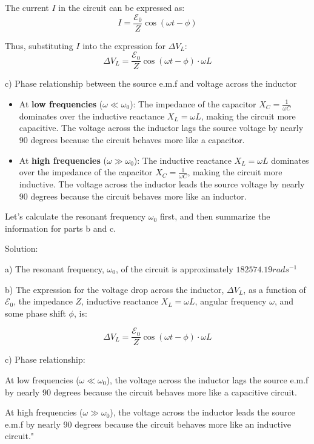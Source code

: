 The current \( I \) in the circuit can be expressed as:
\[ I = \frac{\mathcal{E}_{0}}{Z} \cos(\omega t - \phi) \]

Thus, substituting \( I \) into the expression for \( \Delta V_{L} \):
\[ \Delta V_{L} = \frac{\mathcal{E}_{0}}{Z} \cos(\omega t - \phi) \cdot \omega L \]

c) Phase relationship between the source e.m.f and voltage across the inductor

\begin{itemize}
    \item At \textbf{low frequencies} (\( \omega \ll \omega_{0} \)):
    The impedance of the capacitor \( X_{C} = \frac{1}{\omega C} \) dominates over the inductive reactance \( X_{L} = \omega L \), making the circuit more capacitive. The voltage across the inductor lags the source voltage by nearly 90 degrees because the circuit behaves more like a capacitor.
    
    \item At \textbf{high frequencies} (\( \omega \gg \omega_{0} \)):
    The inductive reactance \( X_{L} = \omega L \) dominates over the impedance of the capacitor \( X_{C} = \frac{1}{\omega C} \), making the circuit more inductive. The voltage across the inductor leads the source voltage by nearly 90 degrees because the circuit behaves more like an inductor.
\end{itemize}

Let's calculate the resonant frequency \( \omega_{0} \) first, and then summarize the information for parts b and c.

Solution:

a) The resonant frequency, \( \omega_0 \), of the circuit is approximately \( 182574.19 rads^{-1} \)

b) The expression for the voltage drop across the inductor, \( \Delta V_L \), as a function of \( \mathcal{E}_0 \), the impedance \(Z\), inductive reactance \(X_L = \omega L\), angular frequency \( \omega \), and some phase shift \( \phi \), is:

\[ \Delta V_L = \frac{\mathcal{E}_0}{Z} \cos(\omega t - \phi) \cdot \omega L \]

c) Phase relationship:

At low frequencies (\( \omega \ll \omega_0 \)), the voltage across the inductor lags the source e.m.f by nearly 90 degrees because the circuit behaves more like a capacitive circuit.

At high frequencies (\( \omega \gg \omega_0 \)), the voltage across the inductor leads the source e.m.f by nearly 90 degrees because the circuit behaves more like an inductive circuit."



